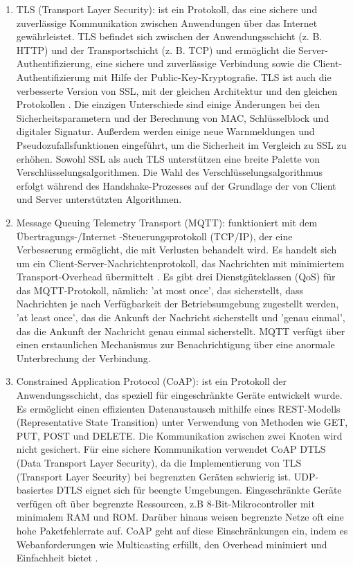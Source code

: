 \begin{enumerate}
          \item TLS (Transport Layer Security): ist ein Protokoll, das eine sichere und zuverlässige Kommunikation zwischen Anwendungen über das Internet gewährleistet\cite{khatoun2022cybersecurity}\cite{info7030044}. TLS befindet sich zwischen der Anwendungsschicht (z. B. HTTP) und der Transportschicht (z. B. TCP) und ermöglicht die Server-Authentifizierung, eine sichere und zuverlässige Verbindung sowie die Client-Authentifizierung mit Hilfe der Public-Key-Kryptografie\cite{khatoun2022cybersecurity}. TLS ist auch die verbesserte Version von SSL, mit der gleichen Architektur und den gleichen Protokollen \cite{khatoun2022cybersecurity}. Die einzigen Unterschiede sind einige Änderungen bei den Sicherheitsparametern und der Berechnung von MAC, Schlüsselblock und digitaler Signatur. Außerdem werden einige neue Warnmeldungen und Pseudozufallsfunktionen eingeführt, um die Sicherheit im Vergleich zu SSL zu erhöhen\cite{satapathy2016comprehensive}\cite{khatoun2022cybersecurity}. Sowohl SSL als auch TLS unterstützen eine breite Palette von Verschlüsselungsalgorithmen. Die Wahl des Verschlüsselungsalgorithmus erfolgt während des Handshake-Prozesses auf der Grundlage der von Client und Server unterstützten Algorithmen.
    \item Message Queuing Telemetry Transport (MQTT): funktioniert mit dem Übertragungs-/Internet -Steuerungsprotokoll (TCP/IP), der eine Verbesserung ermöglicht, die mit Verlusten behandelt wird. Es handelt sich um ein Client-Server-Nachrichtenprotokoll, das Nachrichten mit minimiertem Transport-Overhead übermittelt \cite{8203943}. Es gibt drei Dienstgüteklassen (QoS) für das MQTT-Protokoll, nämlich:
 'at most once', das sicherstellt, dass Nachrichten je nach Verfügbarkeit der Betriebsumgebung zugestellt werden, 
'at least once', das die Ankunft der Nachricht sicherstellt und
 'genau einmal', das die Ankunft der Nachricht genau einmal sicherstellt\cite{8203943}\cite{khatoun2022cybersecurity}. 
MQTT verfügt über einen erstaunlichen Mechanismus zur Benachrichtigung über eine anormale Unterbrechung der Verbindung.



    \item Constrained Application Protocol (CoAP):  ist ein Protokoll der Anwendungsschicht, das speziell für eingeschränkte Geräte entwickelt wurde\cite{8203943}\cite{khatoun2022cybersecurity}. Es ermöglicht einen effizienten Datenaustausch mithilfe eines REST-Modells (Representative State Transition) unter Verwendung von Methoden wie GET, PUT, POST und DELETE. Die Kommunikation zwischen zwei Knoten wird nicht gesichert\cite{oliver2022lightweight}. Für eine sichere Kommunikation verwendet CoAP DTLS (Data Transport Layer Security), da die Implementierung von TLS (Transport Layer Security) bei begrenzten Geräten schwierig ist. UDP-basiertes DTLS eignet sich für beengte Umgebungen\cite{khatoun2022cybersecurity}.
Eingeschränkte Geräte verfügen oft über begrenzte Ressourcen, z.B 8-Bit-Mikrocontroller mit minimalem RAM und ROM. Darüber hinaus weisen begrenzte Netze oft eine hohe Paketfehlerrate auf. CoAP geht auf diese Einschränkungen ein, indem es Webanforderungen wie Multicasting erfüllt, den Overhead minimiert und Einfachheit bietet \cite{8203943}.



\end{enumerate}
